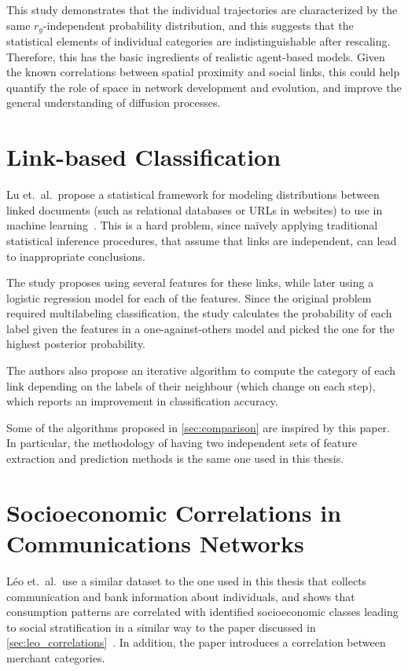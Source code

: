 This study demonstrates that the individual trajectories are characterized by the same $r_g$-independent  probability distribution, and this suggests that the statistical elements of individual categories are indistinguishable after rescaling. Therefore, this has the basic ingredients of realistic agent-based models. Given the known correlations between spatial proximity and social links, this could help quantify the role of space in network development and evolution, and improve the general understanding of diffusion processes.

\section{Link-based Classification}

Lu et.\ al.\ propose a statistical framework for modeling distributions between linked documents (such as relational databases or URLs in websites) to use in machine learning~\cite{lu2003link}. This is a hard problem, since naïvely applying traditional statistical inference procedures, that assume that links are independent, can lead to inappropriate conclusions\cite{jensen1999statistical}.

The study proposes using several features for these links, while later using a logistic regression model for each of the features. Since the original problem required multilabeling classification, the study calculates the probability of each label given the features in a one-against-others model and picked the one for the highest posterior probability.

The authors also propose an iterative algorithm to compute the category of each link depending on the labels of their neighbour (which change on each step), which reports an improvement in classification accuracy.

Some of the algorithms proposed in \cref{sec:comparison} are inspired by this paper.
In particular, the methodology of having two independent sets of feature extraction and prediction methods is the same one used in this thesis.

\section{Socioeconomic Correlations in Communications Networks}

Léo et.\ al.\ use a similar dataset to the one used in this thesis that collects communication and bank information about individuals, and shows that consumption patterns are correlated with identified socioeconomic classes leading to social stratification in a similar way to the paper discussed in \cref{sec:leo_correlations}~\cite{leo2015socioeconomic}.
In addition, the paper introduces a correlation between merchant categories.

